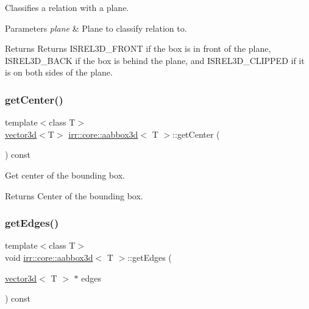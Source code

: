 Classifies a relation with a plane. 


\begin{DoxyParams}{Parameters}
{\em plane} & Plane to classify relation to. \\
\hline
\end{DoxyParams}
\begin{DoxyReturn}{Returns}
Returns I\+S\+R\+E\+L3\+D\+\_\+\+F\+R\+O\+NT if the box is in front of the plane, I\+S\+R\+E\+L3\+D\+\_\+\+B\+A\+CK if the box is behind the plane, and I\+S\+R\+E\+L3\+D\+\_\+\+C\+L\+I\+P\+P\+ED if it is on both sides of the plane. 
\end{DoxyReturn}
\mbox{\label{classirr_1_1core_1_1aabbox3d_ad2e956303fd85f900f93c067fd9c2647}} 
\subsubsection{\texorpdfstring{get\+Center()}{getCenter()}}
{\footnotesize\ttfamily template$<$class T$>$ \\
\hyperlink{classirr_1_1core_1_1vector3d}{vector3d}$<$T$>$ \hyperlink{classirr_1_1core_1_1aabbox3d}{irr\+::core\+::aabbox3d}$<$ T $>$\+::get\+Center (\begin{DoxyParamCaption}{ }\end{DoxyParamCaption}) const\hspace{0.3cm}{\ttfamily [inline]}}



Get center of the bounding box. 

\begin{DoxyReturn}{Returns}
Center of the bounding box. 
\end{DoxyReturn}
\mbox{\label{classirr_1_1core_1_1aabbox3d_acb31d9c6a79559c2636c1e32a3e2e459}} 
\subsubsection{\texorpdfstring{get\+Edges()}{getEdges()}}
{\footnotesize\ttfamily template$<$class T$>$ \\
void \hyperlink{classirr_1_1core_1_1aabbox3d}{irr\+::core\+::aabbox3d}$<$ T $>$\+::get\+Edges (\begin{DoxyParamCaption}\item[{\hyperlink{classirr_1_1core_1_1vector3d}{vector3d}$<$ T $>$ $\ast$}]{edges }\end{DoxyParamCaption}) const\hspace{0.3cm}{\ttfamily [inline]}}



